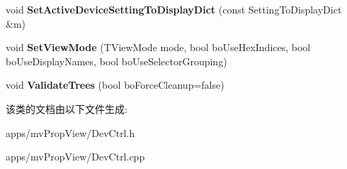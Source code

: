\begin{DoxyCompactItemize}
\item 
\hypertarget{class_device_property_handler_a585ec2c00e37aa17a6da55871bf89618}{void {\bfseries Set\+Active\+Device\+Setting\+To\+Display\+Dict} (const Setting\+To\+Display\+Dict \&m)}\label{class_device_property_handler_a585ec2c00e37aa17a6da55871bf89618}

\item 
\hypertarget{class_device_property_handler_a146d20b44aed95ef7684a2bb7266abb5}{void {\bfseries Set\+View\+Mode} (T\+View\+Mode mode, bool bo\+Use\+Hex\+Indices, bool bo\+Use\+Display\+Names, bool bo\+Use\+Selector\+Grouping)}\label{class_device_property_handler_a146d20b44aed95ef7684a2bb7266abb5}

\item 
\hypertarget{class_device_property_handler_a9d265ba177ba7b15e99245efb1b9f093}{void {\bfseries Validate\+Trees} (bool bo\+Force\+Cleanup=false)}\label{class_device_property_handler_a9d265ba177ba7b15e99245efb1b9f093}

\end{DoxyCompactItemize}


该类的文档由以下文件生成\+:\begin{DoxyCompactItemize}
\item 
apps/mv\+Prop\+View/Dev\+Ctrl.\+h\item 
apps/mv\+Prop\+View/Dev\+Ctrl.\+cpp\end{DoxyCompactItemize}
